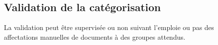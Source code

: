 





\subsection{Validation de la catégorisation}
La validation peut être supervisée ou non suivant l'emploie ou pas des affectations manuelles de documents à des groupes attendus.

